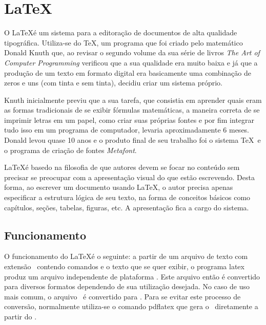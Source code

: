 \section{\LaTeX}
O \LaTeX é um sistema para a editoração de documentos de alta qualidade tipográfica. Utiliza-se do \TeX, um programa que foi criado pelo matemático Donald Knuth que, ao revisar o segundo volume da sua série de livros {\slshape The Art of Computer Programming} verificou que a sua qualidade era muito baixa e já que a produção de um texto em formato digital era basicamente uma combinação de zeros e uns (com tinta e sem tinta), decidiu criar um sistema próprio.

Knuth inicialmente previu que a sua tarefa, que consistia em aprender quais eram as formas tradicionais de se exibir fórmulas matemáticas, a maneira correta de se imprimir letras em um papel, como criar suas próprias fontes e por fim integrar tudo isso em um programa de computador, levaria aproximadamente 6 meses. Donald levou quase 10 anos e o produto final de seu trabalho foi o sistema \TeX \ e o programa de criação de fontes \textit{Metafont}.

\LaTeX é basedo na filosofia de que autores devem se focar no conteúdo sem precisar se preocupar com a apresentação visual do que estão escrevendo. Desta forma, ao escrever um documento usando \LaTeX, o autor precisa apenas especificar a estrutura lógica de seu texto, na forma de conceitos básicos como capítulos, seções, tabelas, figuras, etc. A apresentação fica a cargo do sistema.


\subsection{Funcionamento}

O funcionamento do \LaTeX é o seguinte: a partir de um arquivo de texto com extensão \tex\ contendo comandos e o texto que se quer exibir, o programa \textsf{latex} produz um arquivo independente de plataforma \dvi. Este arquivo então é convertido para diversos formatos dependendo de sua utilização desejada. No caso de uso mais comum, o arquivo \dvi\ é convertido para \pdf. Para se evitar este processo de conversão, normalmente utiliza-se o comando \textsf{pdflatex} que gera o \pdf\ diretamente a partir do \tex.

